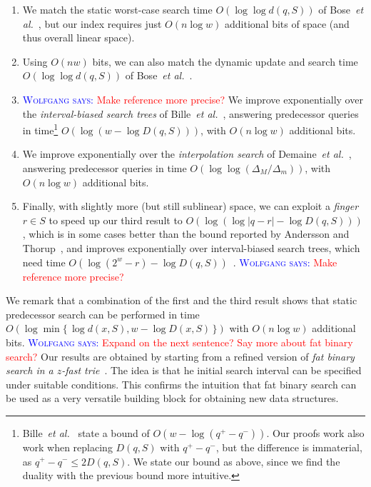 \documentclass[a4paper,11pt]{article}
\newcommand{\etal}{\emph{et al.}\xspace}
\newcommand{\?}{\mskip1.5mu}
\newcommand{\aremark}[3]{\textcolor{blue}{\textsc{#1 #2:}}
  \textcolor{red}{\textsf{#3}}}
\newcommand{\wolfgang}[2][says]{\aremark{Wolfgang}{#1}{#2}}
\begin{document}
\begin{enumerate}
  \item We match the static worst-case search time 
  $O(\log\log d(q, S))$
  of Bose~\etal~\cite{BoseDoDuHoMo13}, but our index requires 
  just $O(n\log w)$ additional bits of space (and thus overall 
  linear space).
  \item Using $O(nw)$ bits, we can also match the dynamic
  update and search time $O(\log\log d(q, S))$
  of Bose~\etal~\cite{BoseDoDuHoMo13}.
  \item 
  \wolfgang{Make reference more precise?}
  We improve exponentially over the \emph{interval-biased search
  trees} of Bille~\etal~\cite{BilleLaRaSaSaWe15}, answering 
  predecessor queries in time\footnote{Bille~\etal~\cite{BilleLaRaSaSaWe15} 
  state a bound of $O(w - \log(q^+ - q^-))$. Our 
  proofs work also work when replacing $D(q, S)$ with $q^+ - q^-$, but 
  the difference is immaterial, as $q^+ - q^-\leq 2D(q, S)$. We state
  our bound as above, since
  we find the duality with the previous bound more intuitive.} 
  $O(\log(w - \log D(q, S)))$, with 
  $O(n\log w)$ additional bits.
  \item We improve exponentially over the \emph{interpolation
  search} of Demaine~\etal~\cite{DemaineJoPa04}, answering
  predecessor queries in time 
  $O(\log\log(\Delta_M / \Delta_m))$, with
  $O(n\log w)$ additional bits.
  \item Finally, with slightly more (but still sublinear) space,
  we can exploit a \emph{finger} $r \in S$ to speed up our third 
  result to $O\left(\log(\log|q - r| - \log D(q, S))\right)$, which is in
  some cases better than the bound reported
  by Andersson and Thorup~\cite{AnderssonTh07}, and improves 
  exponentially over interval-biased search trees, which need 
  time  
  $O\left(\log(2^w - r) - \log D(q, S)\right)$~\cite{BilleLaRaSaSaWe15}.
  \wolfgang{Make reference more precise?}
\end{enumerate}
We remark that a combination of the first
and the third result shows that static predecessor 
search can be performed in time  
$O(\log \min \{\,\log d(x,S),w-\log D(x,S)\,\})$ 
with $O(n \log w)$ additional bits. 
\wolfgang{Expand on the next sentence? Say more about fat binary search?}
Our 
results are obtained by starting from a refined version of
\emph{fat binary search in a $z$-fast trie}~\cite{BelazzouguiBoPaVi09}.
The idea is that
he initial search interval can be specified under 
suitable conditions. This confirms the intuition that fat
binary search can be used as a very versatile building block 
for obtaining new data structures.
\end{document}
